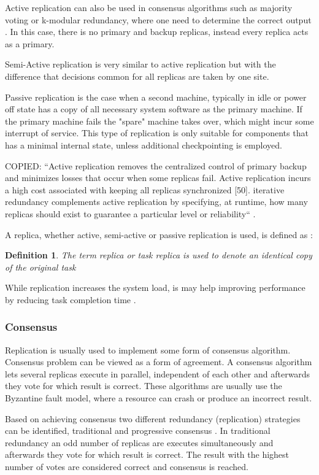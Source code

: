 \documentclass{cslthse-msc}
\newtheorem{definition}{Definition}[chapter]
\begin{document}
Active replication can also be used in consensus algorithms such as majority voting or k-modular redundancy, where one need to determine the correct output \cite{surveyFaultParallel}. In this case, there is no primary and backup replicas, instead every replica acts as a primary.

Semi-Active replication is very similar to active replication but with the difference that decisions common for all replicas are taken by one site.

Passive replication is the case when a second machine, typically in idle or power off state has a copy of all necessary system software as the primary machine. If the primary machine fails the "spare" machine takes over, which might incur some interrupt of service. This type of replication is only suitable for components that has a minimal internal state, unless additional checkpointing is employed.

COPIED:
“Active replication removes the centralized control of primary backup and minimizes losses that occur when some replicas fail. Active replication incurs a high cost associated with keeping all replicas synchronized [50]. iterative redundancy complements active replication by specifying, at runtime, how many replicas should exist to guarantee a particular level or reliability“  \cite{selfAdaptRel}.

A replica, whether active, semi-active or passive replication is used, is defined as \cite{effTaskReplMobGrid}:
\begin{definition} \label{def:replica}
The term replica or task replica is used to denote an identical copy of the original task
\end{definition}

While replication increases the system load, is may help improving performance by reducing task completion time \cite{improvingPerformanceReplication}.

\subsubsection*{Consensus}
Replication is usually used to implement some form of consensus algorithm. Consensus problem can be viewed as a form of agreement. A consensus algorithm lets several replicas execute in parallel, independent of each other and afterwards they vote for which result is correct. These algorithms are usually use the Byzantine fault model, where a resource can crash or produce an incorrect result.

Based on achieving consensus two different redundancy (replication) strategies can be identified, traditional and progressive consensus \cite{selfAdaptRel}. In traditional redundancy an odd number of replicas are executes simultaneously and afterwards they vote for which result is correct. The result with the highest number of votes are considered correct and consensus is reached. %
\end{document}
